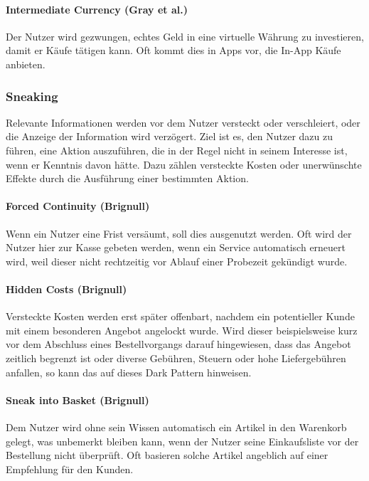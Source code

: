 \documentclass[a4paper]{article}
\begin{document}
\paragraph{Intermediate Currency (Gray et al.)} 
Der Nutzer wird gezwungen, echtes Geld in eine virtuelle Währung zu investieren, damit er Käufe tätigen kann. Oft kommt dies in Apps vor, die In-App Käufe anbieten.

\subsubsection{Sneaking}
Relevante Informationen werden vor dem Nutzer versteckt oder verschleiert, oder die Anzeige der Information wird verzögert. Ziel ist es, den Nutzer dazu zu führen, eine Aktion auszuführen, die in der Regel nicht in seinem Interesse ist, wenn er Kenntnis davon hätte. Dazu zählen versteckte Kosten oder unerwünschte Effekte durch die Ausführung einer bestimmten Aktion.

\paragraph{Forced Continuity (Brignull)}
Wenn ein Nutzer eine Frist versäumt, soll dies ausgenutzt werden. Oft wird der Nutzer hier zur Kasse gebeten werden, wenn ein Service automatisch erneuert wird, weil dieser nicht rechtzeitig vor Ablauf einer Probezeit gekündigt wurde.

\paragraph{Hidden Costs (Brignull)} 
Versteckte Kosten werden erst später offenbart, nachdem ein potentieller Kunde mit einem besonderen Angebot angelockt wurde. Wird dieser beispielsweise kurz vor dem Abschluss eines Bestellvorgangs darauf hingewiesen, dass das Angebot zeitlich begrenzt ist oder diverse Gebühren, Steuern oder hohe Liefergebühren anfallen, so kann das auf dieses Dark Pattern hinweisen. 

\paragraph{Sneak into Basket (Brignull)}
Dem Nutzer wird ohne sein Wissen automatisch ein Artikel in den Warenkorb gelegt, was unbemerkt bleiben kann, wenn der Nutzer seine Einkaufsliste vor der Bestellung nicht überprüft. Oft basieren solche Artikel angeblich auf einer Empfehlung für den Kunden.
\end{document}
